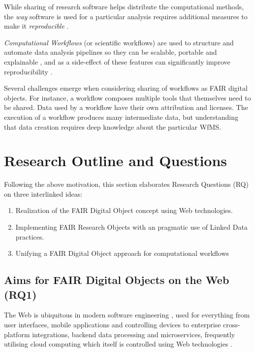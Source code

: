 While sharing of research software helps distribute the computational methods, the \emph{way} software is used for a particular analysis requires additional measures to make it \emph{reproducible} \cite{Stodden 2016,Sandve 2013}.

\emph{Computational Workflows} (or \glspl{scientific workflow}) are used to structure and automate data analysis pipelines so they can be scalable, portable and explainable \cite{Atkinson 2017}, and as a side-effect of these features can significantly improve reproducibility \cite{Cohen-Boulakia 2017}. 

Several challenges emerge when considering sharing of workflows as FAIR digital objects. For instance, a workflow composes multiple tools that themselves need to be shared. Data used by a workflow have their own attribution and licenses. The execution of a workflow produces many intermediate data, but understanding that data creation requires deep knowledge about the particular \acrfull{WfMS}.





\section{Research Outline and Questions}
\label{intro:outline}

Following the above motivation, this section elaborates Research Questions (RQ) on three interlinked ideas:

\begin{enumerate}
    \item Realization of the FAIR Digital Object concept using Web technologies.
    \item Implementing FAIR Research Objects with an pragmatic use of Linked Data practices.
    \item Unifying a FAIR Digital Object approach for computational workflows
\end{enumerate}


\subsection{Aims for FAIR Digital Objects on the Web (RQ1)}
\label{intro:rq1}

The Web is ubiquitous in modern software engineering \cite{Taivalsaari 2021}, used for everything from user interfaces, mobile applications and controlling devices to enterprise cross-platform integrations, backend data processing and microservices, frequently utilising cloud computing which itself is controlled using Web technologies \cite{Marinescu 2023}.

